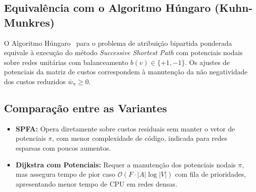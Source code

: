 \subsection{Equivalência com o Algoritmo Húngaro (Kuhn-Munkres)}

O Algoritmo Húngaro~\cite{kuhn1955hungarian, munkres1957algorithms} para o problema de atribuição bipartida ponderada equivale à execução do método \textit{Successive Shortest Path} com potenciais nodais sobre redes unitárias com balanceamento $b(v) \in \{+1, -1\}$. Os ajustes de potenciais da matriz de custos correspondem à manutenção da não negatividade dos custos reduzidos $\bar{w}_\pi \ge 0$.


\subsection{Comparação entre as Variantes}

\begin{itemize}
    \item \textbf{SPFA:} Opera diretamente sobre custos residuais sem manter o vetor de potenciais $\pi$, com menor complexidade de código, indicada para redes esparsas com poucos aumentos.
    \item \textbf{Dijkstra com Potenciais:} Requer a manutenção dos potenciais nodais $\pi$, mas assegura tempo de pior caso $\mathcal{O}(F \cdot |A| \log |V|)$ com fila de prioridades, apresentando menor tempo de CPU em redes densas.
\end{itemize}

